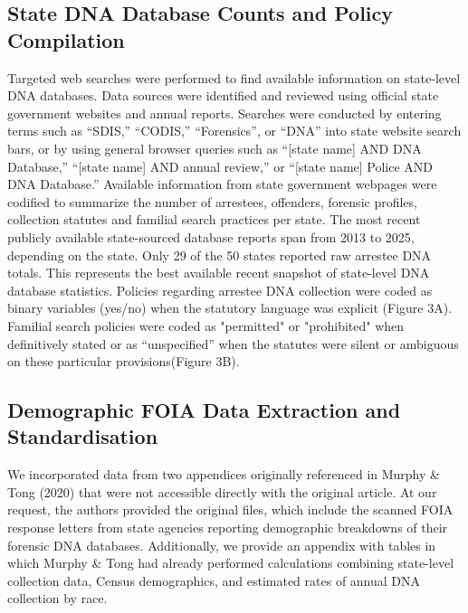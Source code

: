 \documentclass[11pt]{article}
\begin{document}
\subsection*{State DNA Database Counts and Policy Compilation}
Targeted web searches were performed to find available information on state-level DNA databases. Data sources were identified and reviewed using official state government websites and annual reports. Searches were conducted by entering terms such as ``SDIS,'' ``CODIS,'' ``Forensics'', or ``DNA'' into state website search bars, or by using general browser queries such as ``[state name] AND DNA Database,'' ``[state name] AND annual review,'' or ``[state name] Police AND DNA Database.'' Available information from state government webpages were codified to summarize the number of arrestees, offenders, forensic profiles, collection statutes and familial search practices per state. The most recent publicly available state-sourced database reports span from 2013 to 2025, depending on the state. Only 29 of the 50 states reported raw arrestee DNA totals. This represents the best available recent snapshot of state-level DNA database statistics. Policies regarding arrestee DNA collection were coded as binary variables (yes/no) when the statutory language was explicit (Figure 3A). Familial search policies were coded as "permitted" or "prohibited" when definitively stated or as ``unspecified'' when the statutes were silent or ambiguous on these particular provisions(Figure 3B).

\subsection*{Demographic FOIA Data Extraction and Standardisation}

We incorporated data from two appendices originally referenced in Murphy \& Tong (2020) that were not accessible directly with the original article. At our request, the authors provided the original files, which include the scanned FOIA response letters from state agencies reporting demographic breakdowns of their forensic DNA databases. Additionally, we provide an appendix with tables in which Murphy \& Tong had already performed calculations combining state-level collection data, Census demographics, and estimated rates of annual DNA collection by race.
\end{document}
